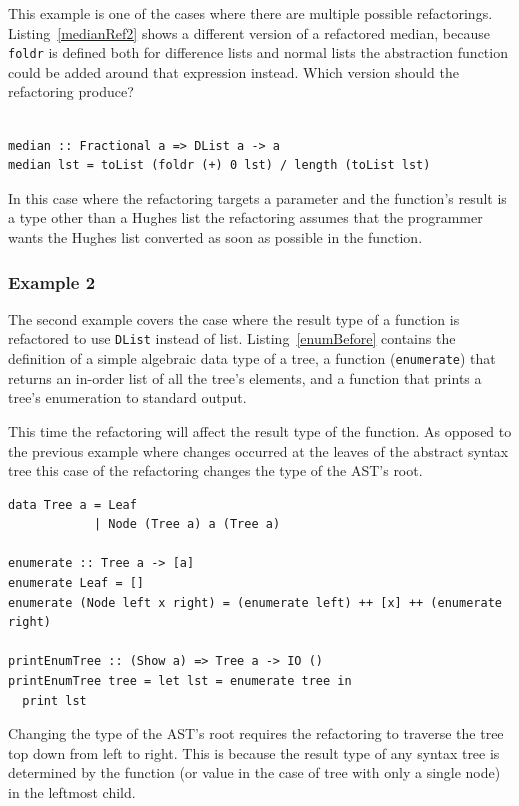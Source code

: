 This example is one of the cases where there are multiple possible refactorings. Listing~\ref{medianRef2} shows a different version of a refactored median, because \texttt{foldr} is defined both for difference lists and normal lists the abstraction function could be added around that expression instead. Which version should the refactoring produce?

\begin{lstlisting}[caption={\texttt{median} refactored another way.}, label=medianRef2]

median :: Fractional a => DList a -> a
median lst = toList (foldr (+) 0 lst) / length (toList lst)

\end{lstlisting}    

In this case where the refactoring targets a parameter and the function's result is a type other than a Hughes list the refactoring assumes that the programmer wants the Hughes list converted as soon as possible in the function. 

\subsubsection{Example 2}

The second example covers the case where the result type of a function is refactored to use \texttt{DList} instead of list. Listing~\ref{enumBefore} contains the definition of a simple algebraic data type of a tree, a function (\texttt{enumerate}) that returns an in-order list of all the tree's elements, and a function that prints a tree's enumeration to standard output. 

This time the refactoring will affect the result type of the function. As opposed to the previous example where changes occurred at the leaves of the abstract syntax tree this case of the refactoring changes the type of the AST's root. 

\begin{lstlisting}[caption={Definition of enumerate}, label=enumBefore]
data Tree a = Leaf
            | Node (Tree a) a (Tree a)

enumerate :: Tree a -> [a]
enumerate Leaf = []
enumerate (Node left x right) = (enumerate left) ++ [x] ++ (enumerate right)

printEnumTree :: (Show a) => Tree a -> IO ()
printEnumTree tree = let lst = enumerate tree in
  print lst
\end{lstlisting}

Changing the type of the AST's root requires the refactoring to traverse the tree top down from left to right. This is because the result type of any syntax tree is determined by the function (or value in the case of tree with only a single node) in the leftmost child. 

